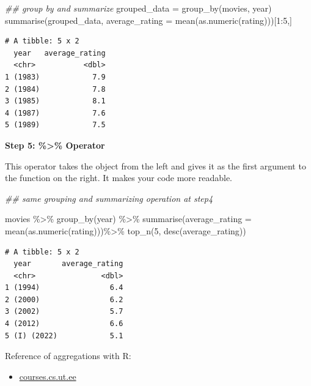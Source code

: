 \documentclass[
  letterpaper,
  DIV=11,
  numbers=noendperiod]{scrreprt}
\newenvironment{Shaded}{\begin{snugshade}}{\end{snugshade}}
\newcommand{\AttributeTok}[1]{\textcolor[rgb]{0.40,0.45,0.13}{#1}}
\newcommand{\DecValTok}[1]{\textcolor[rgb]{0.68,0.00,0.00}{#1}}
\newcommand{\DocumentationTok}[1]{\textcolor[rgb]{0.37,0.37,0.37}{\textit{#1}}}
\newcommand{\FunctionTok}[1]{\textcolor[rgb]{0.28,0.35,0.67}{#1}}
\newcommand{\NormalTok}[1]{\textcolor[rgb]{0.00,0.23,0.31}{#1}}
\newcommand{\OtherTok}[1]{\textcolor[rgb]{0.00,0.23,0.31}{#1}}
\newcommand{\SpecialCharTok}[1]{\textcolor[rgb]{0.37,0.37,0.37}{#1}}
\providecommand{\tightlist}{%
  \setlength{\itemsep}{0pt}\setlength{\parskip}{0pt}}\usepackage{longtable,booktabs,array}
\begin{document}
\begin{Shaded}
\begin{Highlighting}[]
\DocumentationTok{\#\# group by and summarize}
\NormalTok{grouped\_data }\OtherTok{=} \FunctionTok{group\_by}\NormalTok{(movies, year)}
\FunctionTok{summarise}\NormalTok{(grouped\_data, }\AttributeTok{average\_rating =} \FunctionTok{mean}\NormalTok{(}\FunctionTok{as.numeric}\NormalTok{(rating)))[}\DecValTok{1}\SpecialCharTok{:}\DecValTok{5}\NormalTok{,]}
\end{Highlighting}
\end{Shaded}

\begin{verbatim}
# A tibble: 5 x 2
  year   average_rating
  <chr>           <dbl>
1 (1983)            7.9
2 (1984)            7.8
3 (1985)            8.1
4 (1987)            7.6
5 (1989)            7.5
\end{verbatim}

\textbf{Step 5: \%\textgreater\% Operator}

This operator takes the object from the left and gives it as the first
argument to the function on the right. It makes your code more readable.

\begin{Shaded}
\begin{Highlighting}[]
\DocumentationTok{\#\# same grouping and summarizing operation at step4 }

\NormalTok{movies }\SpecialCharTok{\%\textgreater{}\%}
  \FunctionTok{group\_by}\NormalTok{(year) }\SpecialCharTok{\%\textgreater{}\%}
  \FunctionTok{summarise}\NormalTok{(}\AttributeTok{average\_rating =} \FunctionTok{mean}\NormalTok{(}\FunctionTok{as.numeric}\NormalTok{(rating)))}\SpecialCharTok{\%\textgreater{}\%}
  \FunctionTok{top\_n}\NormalTok{(}\DecValTok{5}\NormalTok{, }\FunctionTok{desc}\NormalTok{(average\_rating))}
\end{Highlighting}
\end{Shaded}

\begin{verbatim}
# A tibble: 5 x 2
  year       average_rating
  <chr>               <dbl>
1 (1994)                6.4
2 (2000)                6.2
3 (2002)                5.7
4 (2012)                6.6
5 (I) (2022)            5.1
\end{verbatim}

Reference of aggregations with R:

\begin{itemize}
\tightlist
\item
  \href{https://courses.cs.ut.ee/MTAT.03.183/2017_fall/uploads/Main/dplyr.html}{courses.cs.ut.ee}
\end{itemize}
\end{document}
